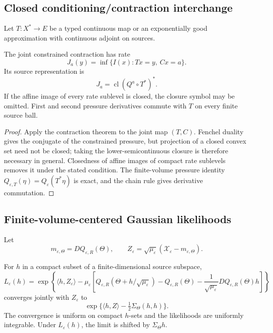 \subsection{Closed conditioning/contraction interchange}

Let \(T:X^*\to E\) be a typed continuous map or an exponentially good
approximation with continuous adjoint on sources.

\begin{theorem}
\label{thm:r5-d1-interchange}
The joint constrained contraction has rate
\[
 J_a(y)
 =
 \inf\{I(x):Tx=y,\ Cx=a\}.
\]
Its source representation is
\[
 J_a
 =
 \operatorname{cl}
 \left(Q^a\circ T^*\right)^*.
\]
If the affine image of every rate sublevel is closed, the closure symbol may
be omitted.  First and second pressure derivatives commute with \(T\) on
every finite source ball.
\end{theorem}

\begin{proof}
Apply the contraction theorem to the joint map \((T,C)\).  Fenchel duality
gives the conjugate of the constrained pressure, but projection of a closed
convex set need not be closed; taking the lower-semicontinuous closure is
therefore necessary in general.  Closedness of affine images of compact rate
sublevels removes it under the stated condition.  The finite-volume pressure
identity
\(Q_{\varepsilon,T}(\eta)=Q_\varepsilon(T^*\eta)\) is exact, and the chain
rule gives derivative commutation.
\end{proof}

\subsection{Finite-volume-centered Gaussian likelihoods}

Let
\[
 m_{\varepsilon,\Theta}=DQ_{\varepsilon,R}(\Theta),
 \qquad
 Z_\varepsilon
 =\sqrt{\mu_\varepsilon}
 ({\mathcal X}_\varepsilon-m_{\varepsilon,\Theta}).
\]

\begin{theorem}
\label{thm:r5-d1-lan}
For \(h\) in a compact subset of a finite-dimensional source subspace,
\[
 L_\varepsilon(h)
 =
 \exp\left\{
 \langle h,Z_\varepsilon\rangle
 -\mu_\varepsilon
 \left[
 Q_{\varepsilon,R}(\Theta+h/\sqrt{\mu_\varepsilon})
 -Q_{\varepsilon,R}(\Theta)
 -\frac1{\sqrt{\mu_\varepsilon}}
  DQ_{\varepsilon,R}(\Theta)h
 \right]\right\}
\]
converges jointly with \(Z_\varepsilon\) to
\[
 \exp\{\langle h,Z\rangle-\tfrac12\Sigma_\Theta(h,h)\}.
\]
The convergence is uniform on compact \(h\)-sets and the likelihoods are
uniformly integrable.  Under \(L_\varepsilon(h)\), the limit is shifted by
\(\Sigma_\Theta h\).
\end{theorem}


